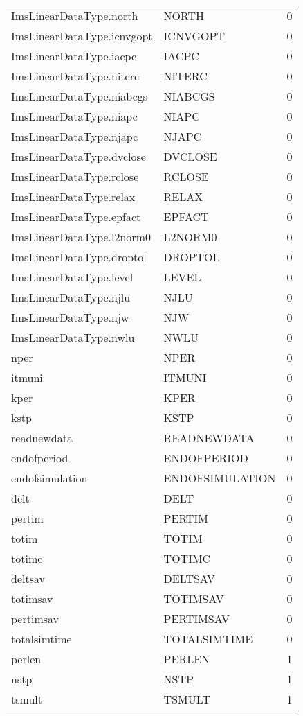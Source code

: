 \begin{longtable}{p{6cm} p{4cm} p{2cm} }
ImsLinearDataType.north &  NORTH & 0 \\ 
ImsLinearDataType.icnvgopt &  ICNVGOPT & 0 \\ 
ImsLinearDataType.iacpc &  IACPC & 0 \\ 
ImsLinearDataType.niterc &  NITERC & 0 \\ 
ImsLinearDataType.niabcgs &  NIABCGS & 0 \\ 
ImsLinearDataType.niapc &  NIAPC & 0 \\ 
ImsLinearDataType.njapc &  NJAPC & 0 \\ 
ImsLinearDataType.dvclose &  DVCLOSE & 0 \\ 
ImsLinearDataType.rclose &  RCLOSE & 0 \\ 
ImsLinearDataType.relax &  RELAX & 0 \\ 
ImsLinearDataType.epfact &  EPFACT & 0 \\ 
ImsLinearDataType.l2norm0 &  L2NORM0 & 0 \\ 
ImsLinearDataType.droptol &  DROPTOL & 0 \\ 
ImsLinearDataType.level &  LEVEL & 0 \\ 
ImsLinearDataType.njlu &  NJLU & 0 \\ 
ImsLinearDataType.njw &  NJW & 0 \\ 
ImsLinearDataType.nwlu &  NWLU & 0 \\ 
nper &  NPER & 0 \\ 
itmuni &  ITMUNI & 0 \\ 
kper &  KPER & 0 \\ 
kstp &  KSTP & 0 \\ 
readnewdata &  READNEWDATA & 0 \\ 
endofperiod &  ENDOFPERIOD & 0 \\ 
endofsimulation &  ENDOFSIMULATION & 0 \\ 
delt &  DELT & 0 \\ 
pertim &  PERTIM & 0 \\ 
totim &  TOTIM & 0 \\ 
totimc &  TOTIMC & 0 \\ 
deltsav &  DELTSAV & 0 \\ 
totimsav &  TOTIMSAV & 0 \\ 
pertimsav &  PERTIMSAV & 0 \\ 
totalsimtime &  TOTALSIMTIME & 0 \\ 
perlen &  PERLEN & 1 \\ 
nstp &  NSTP & 1 \\ 
tsmult &  TSMULT & 1 \\ 

\end{longtable}
